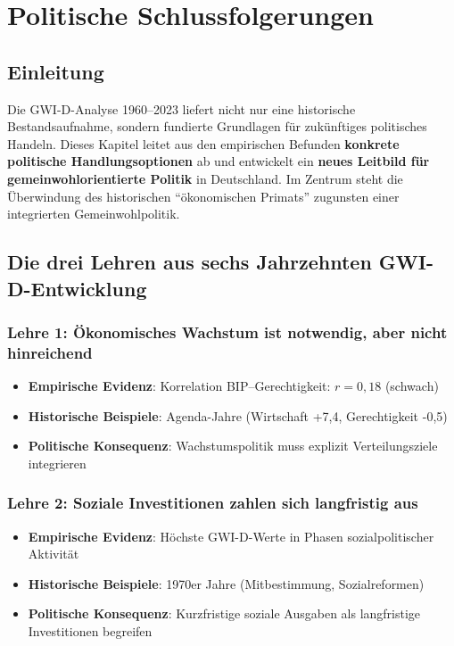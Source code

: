 \chapter{Politische Schlussfolgerungen}
\label{chap:politische_schlussfolgerungen}

\section*{Einleitung}
Die GWI-D-Analyse 1960–2023 liefert nicht nur eine historische Bestandsaufnahme, sondern fundierte Grundlagen für zukünftiges politisches Handeln. Dieses Kapitel leitet aus den empirischen Befunden \textbf{konkrete politische Handlungsoptionen} ab und entwickelt ein \textbf{neues Leitbild für gemeinwohlorientierte Politik} in Deutschland. Im Zentrum steht die Überwindung des historischen \enquote{ökonomischen Primats} zugunsten einer integrierten Gemeinwohlpolitik.

\section{Die drei Lehren aus sechs Jahrzehnten GWI-D-Entwicklung}

\subsection{Lehre 1: Ökonomisches Wachstum ist notwendig, aber nicht hinreichend}

\begin{itemize}
    \item \textbf{Empirische Evidenz}: Korrelation BIP–Gerechtigkeit: \(r = 0,18\) (schwach)
    \item \textbf{Historische Beispiele}: Agenda-Jahre (Wirtschaft +7,4, Gerechtigkeit -0,5)
    \item \textbf{Politische Konsequenz}: Wachstumspolitik muss explizit Verteilungsziele integrieren
\end{itemize}

\subsection{Lehre 2: Soziale Investitionen zahlen sich langfristig aus}

\begin{itemize}
    \item \textbf{Empirische Evidenz}: Höchste GWI-D-Werte in Phasen sozialpolitischer Aktivität
    \item \textbf{Historische Beispiele}: 1970er Jahre (Mitbestimmung, Sozialreformen)
    \item \textbf{Politische Konsequenz}: Kurzfristige soziale Ausgaben als langfristige Investitionen begreifen
\end{itemize}

